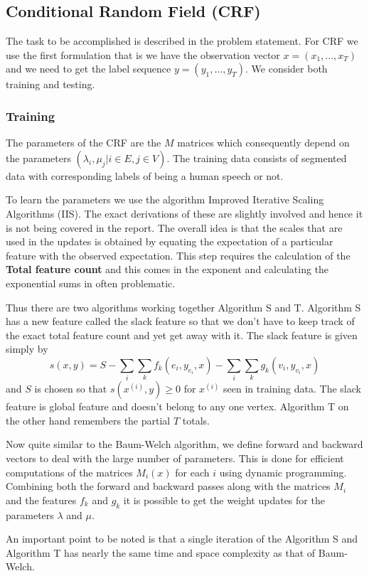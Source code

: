\documentclass[letterpaper]{article} %
\begin{document}
\subsection{Conditional Random Field (CRF)}
The task to be accomplished is described in the problem statement. For CRF we use the first formulation that is we have the observation vector $x = (x_1, ..., x_T)$ and we need to get the label sequence $y = (y_1, ... , y_T)$. We consider both training and testing.

\subsubsection{Training}The parameters of the CRF are the $M$ matrices which consequently depend on the parameters $(\lambda_i, \mu_j| i \in E, j \in V)$. The training data consists of segmented data with corresponding labels of being a human speech or not.

To learn the parameters we use the algorithm Improved Iterative Scaling Algorithms (IIS). The exact derivations of these are slightly involved and hence it is not being covered in the report. The overall idea is that the scales that are used in the updates is obtained by equating the expectation of a particular feature with the observed expectation. This step requires the calculation of the \textbf{Total feature count} and this comes in the exponent and calculating the exponential sums in often problematic.

Thus there are two algorithms working together Algorithm S and T. Algorithm S has a new feature called the slack feature so that we don't have to keep track of the exact total feature count and yet get away with it. The slack feature is given simply by $$s(x, y) = S - \sum_i \sum_k f_k(e_i, y_{e_i}, x) - \sum_i \sum_k g_k(v_i, y_{v_i}, x)$$ and $S$ is chosen so that $s(x^{(i)}, y) \ge 0$ for $x^{(i)}$ seen in training data. The slack feature is global feature and doesn't belong to any one vertex. Algorithm T on the other hand remembers the partial $T$ totals.

Now quite similar to the Baum-Welch algorithm, we define forward and backward vectors to deal with the large number of parameters. This is done for efficient computations of the matrices $M_i(x)$ for each $i$ using dynamic programming. Combining both the forward and backward passes along with the matrices $M_i$ and the features $f_k$ and $g_k$ it is possible to get the weight updates for the parameters $\lambda$ and $\mu$.

An important point to be noted is that a single iteration of the Algorithm S and Algorithm T has nearly the same time and space complexity as that of Baum-Welch.
\end{document}

